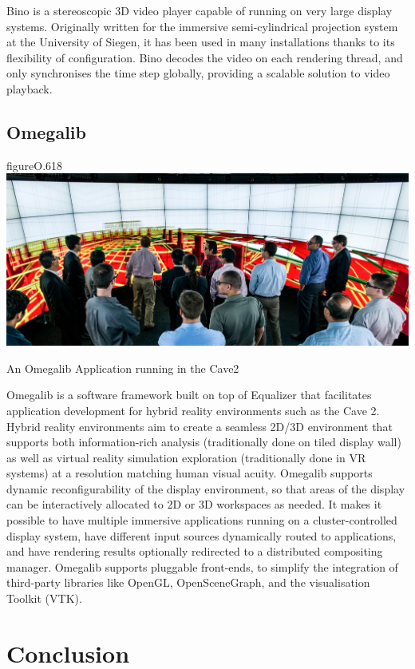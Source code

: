 Bino is a stereoscopic 3D video player capable of running on very large display
systems. Originally written for the immersive semi-cylindrical projection
system at the University of Siegen, it has been used in many installations
thanks to its flexibility of configuration. Bino decodes the video on each
rendering thread, and only synchronises the time step globally, providing a
scalable solution to video playback.

\section{Omegalib}

\begin{wrapfloat}{figure}{O}{.618\textwidth}
  \includegraphics[width=.618\textwidth]{images/omegalib}
  {\caption{\label{fOmegalib}An Omegalib Application running in the Cave2}}
\end{wrapfloat}

Omegalib \cite{Omegalib} is a software framework built on top of Equalizer that
facilitates application development for hybrid reality environments such as the
Cave 2. Hybrid reality environments aim to create a seamless 2D/3D environment
that supports both information-rich analysis (traditionally done on tiled
display wall) as well as virtual reality simulation exploration (traditionally
done in VR systems) at a resolution matching human visual acuity. Omegalib
supports dynamic reconfigurability of the display environment, so that areas of
the display can be interactively allocated to 2D or 3D workspaces as needed. It
makes it possible to have multiple immersive applications running on a
cluster-controlled display system, have different input sources dynamically
routed to applications, and have rendering results optionally redirected to a
distributed compositing manager. Omegalib supports pluggable front-ends, to
simplify the integration of third-party libraries like OpenGL, OpenSceneGraph,
and the visualisation Toolkit (VTK).


\chapter{Conclusion}\label{sConclusion}

